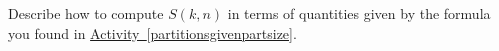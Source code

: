 \documentclass{book}
\begin{document}
\setcounter{project}{277}
\addtocounter{project}{-1}
\begin{activity}[]\label{activity-270}
\hypertarget{p-1468}{}%
Describe how to compute \(S(k,n)\) in terms of quantities given by the formula you found in \hyperref[partitionsgivenpartsize]{Activity~\ref{partitionsgivenpartsize}}.%
\end{activity}
\end{document}
